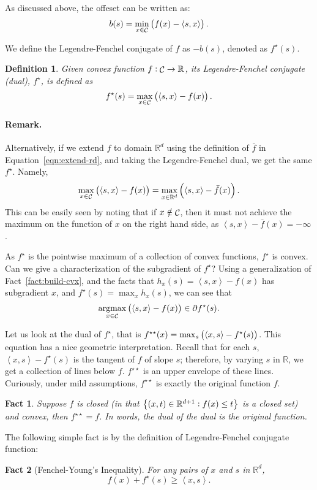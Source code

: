 \documentclass{article}
\newtheorem{definition}{Definition}
\newtheorem{fact}{Fact}
\DeclareMathOperator*{\Ccal}{{\cal C}}
\DeclareMathOperator*{\argmax}{{\rm argmax}}
\newcommand{\RR}{\mathbb{R}} %
\newcommand{\inner}[2]{\left\langle #1,#2 \right\rangle}
\begin{document}
As discussed above, the offeset can be written as:
\[ b(s) =  \min_{x \in \Ccal} \del{f(x) - \inner{s}{x}}. \]

We define the Legendre-Fenchel conjugate of $f$ as $-b(s)$, denoted as $f^\star(s)$. \begin{definition}
Given convex function $f: \Ccal \to \RR$, its Legendre-Fenchel conjugate (dual), $f^\star$, is defined as
\[ f^\star(s) = \max_{x \in \Ccal} \del{\inner{s}{x} - f(x)}. \]
\end{definition}

\paragraph{Remark.} Alternatively, if we extend $f$ to domain $\RR^d$ using the definition of $\bar{f}$ in Equation~\ref{eqn:extend-rd}, and taking the Legendre-Fenchel dual, we get the same $f^\star$. Namely,
\[ \max_{x \in \Ccal} \del{\inner{s}{x} - f(x)} = \max_{x \in \RR^d} \del{\inner{s}{x} - \bar{f}(x)}. \]
This can be easily seen by noting that if $x \notin \Ccal$, then it must not achieve the maximum on the function of $x$ on the right hand side, as $\inner{s}{x}-\bar{f}(x) = -\infty$.

As $f^\star$ is the pointwise maximum of a collection of convex functions, $f^\star$ is convex. Can we give a characterization of the subgradient of $f^\star$? Using a generalization of Fact~\ref{fact:build-cvx}, and the facts that $h_x(s) = \inner{s}{x} - f(x)$ has subgradient $x$, and $f^\star(s) = \max_x h_x(s)$,
we can see that
\[ \argmax_{x \in \Ccal} \del{\inner{s}{x} - f(x)} \in \partial f^\star (s). \]

Let us look at the dual of $f^\star$, that is $f^{\star\star}(x) = \max_{s} \del{\inner{x}{s} - f^\star(s)}$. This equation has a nice geometric interpretation. Recall that for each $s$, $\inner{x}{s} - f^\star(s)$ is the tangent of $f$ of slope $s$; therefore, by varying $s$ in $\RR$, we get a collection of lines below $f$. $f^{\star\star}$ is an upper envelope of these lines. Curiously, under mild assumptions, $f^{\star\star}$ is exactly the original function $f$.

\begin{fact}
Suppose $f$ is closed (in that $\cbr{(x,t) \in \RR^{d+1}: f(x) \leq t}$ is a closed set) and
convex, then $f^{\star\star} = f$. In words, the dual of the dual is the original function.
\end{fact}

The following simple fact is by the definition of Legendre-Fenchel conjugate function:
\begin{fact}[Fenchel-Young's Inequality]
For any pairs of $x$ and $s$ in $\RR^d$,
\[ f(x) + f^\star(s) \geq \inner{x}{s}. \]
\end{fact}
\end{document}
